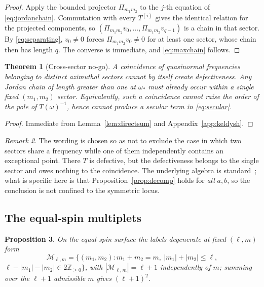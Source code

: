 \documentclass[aps,prd,reprint,superscriptaddress,nofootinbib,longbibliography]{revtex4-2}
\theoremstyle{plain}
\newtheorem{theorem}{Theorem}
\newtheorem{proposition}[theorem]{Proposition}
\theoremstyle{definition}
\theoremstyle{remark}
\newtheorem{remark}[theorem]{Remark}
\begin{document}
\begin{proof}
Apply the bounded projector $\Pi_{m_1m_2}$ to the $j$-th equation of
\eqref{eq:jordanchain}. Commutation with every $T^{(i)}$ gives the identical
relation for the projected components, so
$(\Pi_{m_1m_2}v_0,\dots,\Pi_{m_1m_2}v_{q-1})$ is a chain in that sector. By
\eqref{eq:separating}, $v_0\ne0$ forces $\Pi_{m_1m_2}v_0\ne0$ for at least one
sector, whose chain then has length $q$. The converse is immediate, and
\eqref{eq:maxchain} follows.
\end{proof}

\begin{theorem}[Cross-sector no-go]\label{thm:nogo}
A coincidence of quasinormal frequencies belonging to \emph{distinct} azimuthal
sectors cannot by itself create defectiveness. Any Jordan chain of length
greater than one at $\omega_*$ must already occur within a single fixed
$(m_1,m_2)$ sector. Equivalently, such a coincidence cannot raise the order of
the pole of $T(\omega)^{-1}$, hence cannot produce a secular term in
\eqref{eq:secular}.
\end{theorem}

\begin{proof}
Immediate from Lemma~\ref{lem:directsum} and Appendix~\ref{app:keldysh}.
\end{proof}

\begin{remark}
The wording is chosen so as not to exclude the case in which two sectors share a
frequency while one of them independently contains an exceptional point. There
$T$ is defective, but the defectiveness belongs to the single sector and owes
nothing to the coincidence. The underlying algebra is standard~\cite{KatoE71};
what is specific here is that Proposition~\ref{prop:decomp} holds for
\emph{all} $a,b$, so the conclusion is not confined to the symmetric locus.
\end{remark}

\subsection{The equal-spin multiplets}\label{sec:nogo:multiplets}

\begin{proposition}\label{prop:multiplet}
On the equal-spin surface the labels degenerate at fixed $(\ell,m)$ form
\begin{equation}\label{eq:multipletset}
  \mathcal{M}_{\ell,m}=\big\{(m_1,m_2): m_1+m_2=m,\ |m_1|+|m_2|\le\ell,
\end{equation}
$\ell-|m_1|-|m_2|\in2\mathbb{Z}_{\ge0}\big\}$, with
$|\mathcal{M}_{\ell,m}|=\ell+1$ independently of $m$; summing over the $\ell+1$
admissible $m$ gives $(\ell+1)^2$.
\end{proposition}
\end{document}
